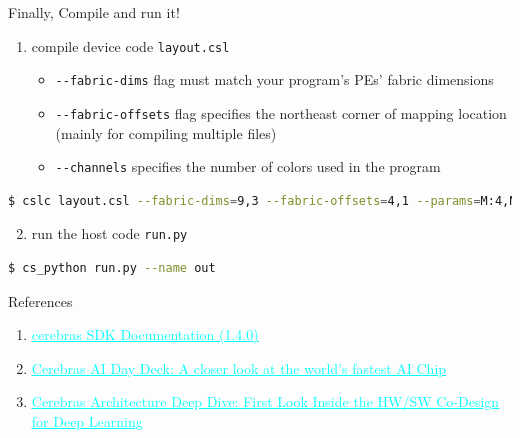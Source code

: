 \documentclass[dvipdfmx, 11pt, aspectratio=169]{beamer}   %
\newcommand{\ulhref}[2]{\href{#1}{\textcolor{cyan}{\uline{#2}}}}
\begin{document}
\begin{frame}[fragile]{Finally, Compile and run it!}
\begin{enumerate}
    \item compile device code \lstinline|layout.csl|
    \begin{itemize}
        \item \lstinline|--fabric-dims| flag must match your program's PEs' fabric dimensions
        \item \lstinline|--fabric-offsets| flag specifies the northeast corner of mapping location (mainly for compiling multiple files)
        \item \lstinline|--channels| specifies the number of colors used in the program
    \end{itemize}
\end{enumerate}
\begin{lstlisting}[language=bash]
$ cslc layout.csl --fabric-dims=9,3 --fabric-offsets=4,1 --params=M:4,N:6 --memcpy --channels=1 -o out
\end{lstlisting}
\begin{enumerate}\setcounter{enumi}{1}
    \item run the host code \lstinline|run.py|
\end{enumerate}
\begin{lstlisting}[language=bash]
$ cs_python run.py --name out
\end{lstlisting}
\end{frame}
\begin{frame}[fragile]{References}
  \begin{enumerate}\footnotesize
    \item \ulhref{https://sdk.cerebras.net/computing-with-cerebras}{cerebras SDK Documentation (1.4.0)}
    \item \ulhref{https://www.slideshare.net/slideshow/cerebras-ai-day-deck-a-closer-look-at-the-worlds-fastest-ai-chip/266911791}{Cerebras AI Day Deck: A closer look at the world's fastest AI Chip}
    \item \ulhref{https://hc34.hotchips.org/assets/program/conference/day2/Machine\%20Learning/HC2022_Cerebras_Final_v02.pdf}{Cerebras Architecture Deep Dive: First Look Inside the HW/SW Co-Design for Deep Learning}
  \end{enumerate}
\end{frame}
\end{document}

